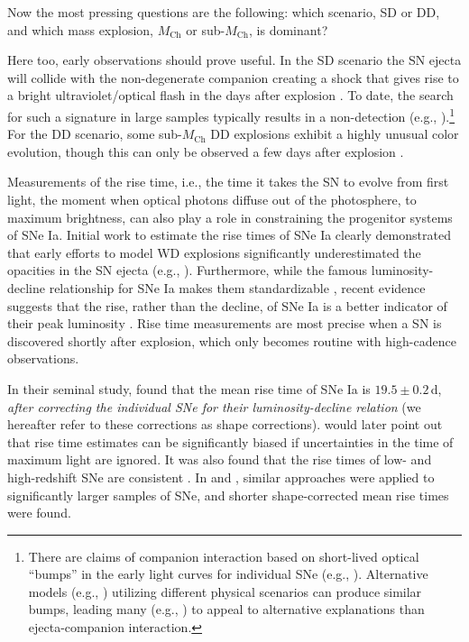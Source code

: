 \documentclass[twocolumn]{aastex63}
\begin{document}
Now the most pressing questions are the following: which scenario, SD or DD,
and which mass explosion, $M_\mathrm{Ch}$ or sub-$M_\mathrm{Ch}$, is dominant?

Here too, early observations should prove useful. In the SD scenario the SN
ejecta will collide with the non-degenerate companion creating a shock that
gives rise to a bright ultraviolet/optical flash in the days after explosion
\citep{Kasen10a}. To date, the search for such a signature in large samples
typically results in a non-detection (e.g.,
\citealt{Hayden10,Ganeshalingam11,Bianco11}).\footnote{There are claims of
companion interaction based on short-lived optical ``bumps'' in the early
light curves for individual SNe (e.g.,
\citealt{Cao15,Marion16,Hosseinzadeh17,Dimitriadis19}). Alternative models
(e.g., \citealt{Dessart14,Piro16}) utilizing different physical scenarios can
produce similar bumps, leading many (e.g.,
\citealt{Kromer16,Shappee16a,Noebauer17,Miller18,Shappee19}) to appeal to
alternative explanations than ejecta-companion interaction.} For the DD
scenario, some sub-$M_\mathrm{Ch}$ DD explosions exhibit a highly unusual
color evolution, though this can only be observed a few days after explosion
\citep{Noebauer17,Polin19}.

Measurements of the rise time, i.e., the time it takes the SN to evolve from
first light, the moment when optical photons diffuse out of the photosphere, to
maximum brightness, can also play a role in constraining the progenitor systems
of SNe Ia. Initial work to estimate the rise times of SNe Ia clearly
demonstrated that early efforts to model WD explosions significantly
underestimated the opacities in the SN ejecta (e.g., \citealt{Riess99a}).
Furthermore, while the famous luminosity-decline relationship for SNe Ia makes
them standardizable \citep{Phillips93}, recent evidence suggests that the rise,
rather than the decline, of SNe Ia is a better indicator of their peak
luminosity \citep{Hayden19}. Rise time measurements are most precise when a SN
is discovered shortly after explosion, which only becomes routine with
high-cadence observations.

In their seminal study, \citet{Riess99a} found that the mean rise time of SNe
Ia is $19.5 \pm 0.2$\,d, \textit{after correcting the individual SNe for their
luminosity-decline relation} (we hereafter refer to these corrections as shape
corrections). \citet{Aldering00} would later point out that rise time
estimates can be significantly biased if uncertainties in the time of maximum
light are ignored. It was also found that the rise times of low- and
high-redshift SNe are consistent \citep{Aldering00,Conley06}. In
\citet{Hayden10} and \citet{Ganeshalingam11}, similar approaches were applied
to significantly larger samples of SNe, and shorter shape-corrected mean rise
times were found.
\end{document}
